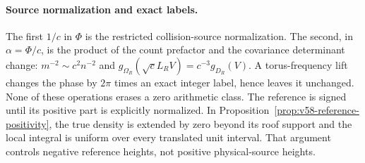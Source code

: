 \paragraph{Source normalization and exact labels.}
The first $1/c$ in $\Phi$ is the restricted collision-source
normalization. The second, in $\alpha=\Phi/c$, is the product of the
count prefactor and the covariance determinant change:
$m^{-2}\sim c^2n^{-2}$ and
$g_{\Omega_R}(\sqrt cL_RV)=c^{-3}g_{D_R}(V)$.
A torus-frequency lift changes the phase by $2\pi$ times an exact
integer label, hence leaves it unchanged. None of these operations
erases a zero arithmetic class. The reference is signed until its
positive part is explicitly normalized. In
Proposition~\ref{prop:v58-reference-positivity}, the true density is
extended by zero beyond its roof support and the local integral is
uniform over every translated unit interval. That argument controls
negative reference heights, not positive physical-source heights.
